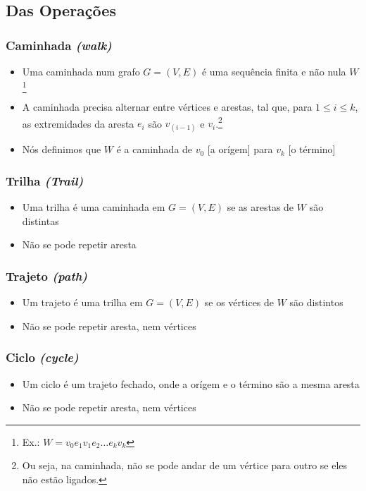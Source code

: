 \documentclass[12pt]{article}
\begin{document}
\subsection{Das Operações}

\subsubsection{Caminhada \textit{(walk)}}
\begin{itemize}
	\item Uma caminhada num grafo $G = (V, E)$ é uma sequência finita e não nula $W$\footnote{
		      Ex.: $W = v_0 e_1 v_1 e_2 \dots e_k v_k$
	      }
	\item A caminhada precisa alternar entre vértices e arestas, tal que, para $1 \leq i \leq k$, as extremidades da aresta $e_i$ são $v_(i-1)$ e $v_i$.\footnote{
		      Ou seja, na caminhada, não se pode andar de um vértice para outro se eles não estão ligados.
	      }
	\item Nós definimos que $W$ é a caminhada de $v_0$ [a orígem] para $v_k$ [o término]
\end{itemize}

\subsubsection{Trilha \textit{(Trail)}}
\begin{itemize}
	\item Uma trilha é uma caminhada em $G = (V, E)$ se as arestas de $W$ são distintas
	\item Não se pode repetir aresta
\end{itemize}

\subsubsection{Trajeto \textit{(path)}}
\begin{itemize}
	\item Um trajeto é uma trilha em $G = (V, E)$ se os vértices de $W$ são distintos
	\item Não se pode repetir aresta, nem vértices
\end{itemize}

\subsubsection{Ciclo \textit{(cycle)}}
\begin{itemize}
	\item Um ciclo é um trajeto fechado, onde a orígem e o término são a mesma aresta
	\item Não se pode repetir aresta, nem vértices
\end{itemize}
\end{document}
